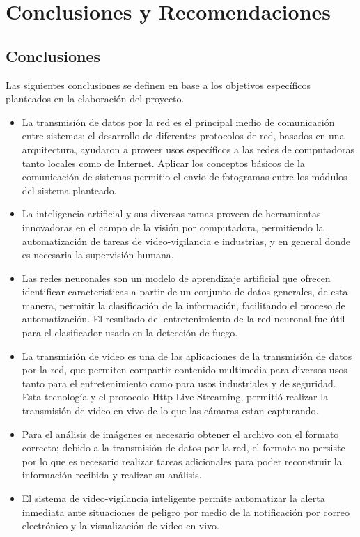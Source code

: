 \chapter{Conclusiones y Recomendaciones}
\section{Conclusiones}
Las siguientes conclusiones se definen en base a los objetivos específicos planteados en la elaboración del proyecto.\\

\begin{itemize}
    \item La transmisión de datos por la red es el principal medio de comunicación entre sistemas; el desarrollo de diferentes protocolos de red, basados en una arquitectura, ayudaron a proveer usos específicos a las redes de computadoras tanto locales como de Internet. Aplicar los conceptos básicos de la comunicación de sistemas permitio el envio de fotogramas entre los módulos del sistema planteado.
    
    \item La inteligencia artificial y sus diversas ramas proveen de herramientas innovadoras en el campo de la visión por computadora, permitiendo la automatización de tareas de video-vigilancia e industrias, y en general donde es necesaria la supervisión humana.
    
    \item Las redes neuronales son un modelo de aprendizaje artificial que ofrecen identificar caracteristicas a partir de un conjunto de datos generales, de esta manera, permitir la clasificación de la información, facilitando el proceso de automatización. El resultado del entretenimiento de la red neuronal fue útil para el clasificador usado en la detección de fuego.
    
    \item La transmisión de video es una de las aplicaciones de la transmisión de datos por la red, que permiten compartir contenido multimedia para diversos usos tanto para el entretenimiento como para usos industriales y de seguridad. Esta tecnología y el protocolo Http Live Streaming, permitió realizar la transmisión de video en vivo de lo que las cámaras estan capturando.
    
    \item Para el análisis de imágenes es necesario obtener el archivo con el formato correcto; debido a la transmisión de datos por la red, el formato no persiste por lo que es necesario realizar tareas adicionales para poder reconstruir la información recibida y realizar su análisis.
    
    \item El sistema de video-vigilancia inteligente permite automatizar la alerta inmediata ante situaciones de peligro por medio de la notificación por correo electrónico y la visualización de video en vivo.
\end{itemize}

